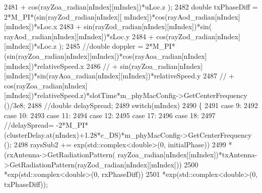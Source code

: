 \begin{DoxyCode}
2481                                                                 + cos(rayZoa\_radian[nIndex][mIndex])*uLoc.z
      );
2482                                                 \textcolor{keywordtype}{double} txPhaseDiff = 2*M\_PI*(sin(rayZod\_radian[nIndex][
      mIndex])*cos(rayAod\_radian[nIndex][mIndex])*sLoc.x
2483                                                                 + sin(rayZod\_radian[nIndex][mIndex])*sin(
      rayAod\_radian[nIndex][mIndex])*sLoc.y
2484                                                                 + cos(rayZod\_radian[nIndex][mIndex])*sLoc.z
      );
2485                                                 \textcolor{comment}{//double doppler =
       2*M\_PI*(sin(rayZoa\_radian[nIndex][mIndex])*cos(rayAoa\_radian[nIndex][mIndex])*relativeSpeed.x}
2486                                                 \textcolor{comment}{//              +
       sin(rayZoa\_radian[nIndex][mIndex])*sin(rayAoa\_radian[nIndex][mIndex])*relativeSpeed.y}
2487                                                 \textcolor{comment}{//              +
       cos(rayZoa\_radian[nIndex][mIndex])*relativeSpeed.z)*slotTime*m\_phyMacConfig->GetCenterFrequency ()/3e8;}
2488                                                 \textcolor{comment}{//double delaySpread;}
2489                                                 \textcolor{keywordflow}{switch}(mIndex)
2490                                                 \{
2491                                                 \textcolor{keywordflow}{case} 9:
2492                                                 \textcolor{keywordflow}{case} 10:
2493                                                 \textcolor{keywordflow}{case} 11:
2494                                                 \textcolor{keywordflow}{case} 12:
2495                                                 \textcolor{keywordflow}{case} 17:
2496                                                 \textcolor{keywordflow}{case} 18:
2497                                                         \textcolor{comment}{//delaySpread=
       -2*M\_PI*(clusterDelay.at(nIndex)+1.28*c\_DS)*m\_phyMacConfig->GetCenterFrequency ();}
2498                                                         raysSub2 += exp(std::complex<double>(0, 
      initialPhase))
2499                                                                 *(rxAntenna->GetRadiationPattern(
      rayZoa\_radian[nIndex][mIndex])*txAntenna->GetRadiationPattern(rayZod\_radian[nIndex][mIndex]))
2500                                                                 *exp(std::complex<double>(0, rxPhaseDiff))
2501                                                                 *exp(std::complex<double>(0, txPhaseDiff));

\end{DoxyCode}
